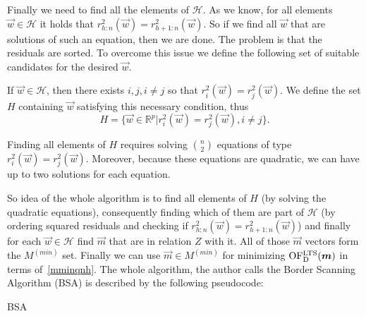 Finally we need to find all the elements of $\mathcal{H}$. As we know, for all elements $\vec{w} \in \mathcal{H}$ it holds that $r^{2}_{h:n}(\vec{w}) = r^{2}_{h+1:n}(\vec{w})$. So if we find all $\vec{w}$ that are solutions of such an equation, then we are done. The problem is that the residuals are sorted. To overcome this issue we define the following set of suitable candidates for the desired $\vec{w}$.


If $\vec{w} \in \mathcal{H}$, then there exists $i,j, i \neq j$ so that
    $r^{2}_i(\vec{w}) = r^{2}_j(\vec{w})$. We define the set $H$ containing $\vec{w}$ satisfying this necessary condition, thus
\begin{equation}
    H = \{{ \vec{w} \in \mathbb{R}^p | r^{2}_i(\vec{w}) = r^{2}_j(\vec{w}), i \neq j  \}}.   
\end{equation}
    
Finding all elements of $H$ requires solving $\binom{n}{2}$ equations of type $r^{2}_i(\vec{w}) = r^{2}_j(\vec{w})$. Moreover, because these equations are quadratic, we can have up to two solutions for each equation.

So idea of the whole algorithm is to find all elements of $H$ (by solving the quadratic equations), consequently finding which of them are part of $\mathcal{H}$ (by ordering squared residuals and checking if $r^{2}_{h:n}(\vec{w}) = r^{2}_{h+1:n}(\vec{w})$) and finally for each $\vec{w} \in \mathcal{H}$ find $\vec{m}$ that are in relation $Z$ with it. All of those $\vec{m}$ vectors form the $M^{(min)}$ set. Finally we can use $\vec{m} \in M^{(min)}$ for minimizing $\operatorname{OF^{LTS}_D}(\boldsymbol{m})$ in terms of~\eqref{mminqnh}. The whole algorithm, the author calls the Border Scanning Algorithm (BSA) is described by the following pseudocode:

\begin{algorithm}[H]
    \label{alg:border:scanning:bsa:onedim}

      \caption{BSA}


      

    \;
\end{algorithm}


